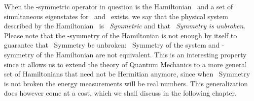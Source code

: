         When the \PT-symmetric operator in question is the Hamiltonian \hH\ and a set of simultaneous eigenstates for \hH\ and \hPT\ exists, we say that the physical system described by the Hamiltonian \hH\ is \emph{\PT\ Symmetric} and that \emph{\PT\ Symmetry is unbroken}. Please note that the \PT-symmetry of the Hamiltonian is not enough by itself to guarantee that \PT\ Symmetry be unbroken: \PT\ Symmetry of the system and \PT-symmetry of the Hamiltonian are not equivalent. This is an interesting property since it allows us to extend the theory of Quantum Mechanics to a more general set of Hamiltonians that need not be Hermitian anymore, since when \PT\ Symmetry is not broken the energy measurements will be real numbers. This generalization does however come at a cost, which we shall discuss in the following chapter.